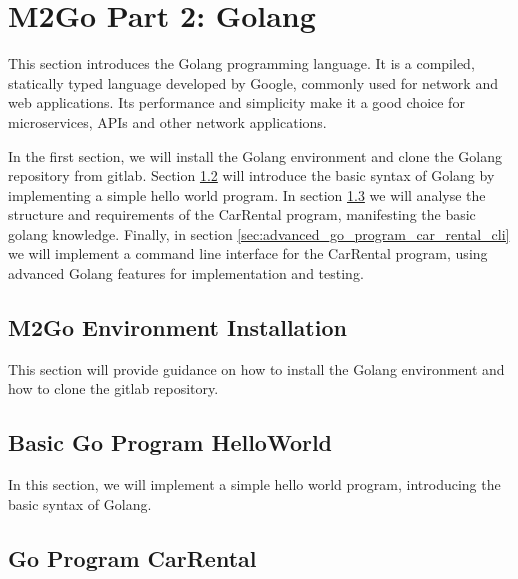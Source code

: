 \chapter{M2Go Part 2: Golang}
\label{cha:golang}
This section introduces the Golang programming language.
It is a compiled, statically typed language developed by Google, commonly used for network and web applications.
Its performance and simplicity make it a good choice for microservices, APIs and other network applications.

In the first section, we will install the Golang environment and clone the Golang repository from gitlab.
Section \ref{sec:basic_go_program} will introduce the basic syntax of Golang by implementing a simple hello world program.
In section \ref{sec:go_program_car_rental} we will analyse the structure and requirements of the CarRental program, manifesting the basic golang knowledge.
Finally, in section \ref{sec:advanced_go_program_car_rental_cli} we will implement a command line interface for the CarRental program, using advanced Golang features for implementation and testing.


\section{M2Go Environment Installation}
\label{sec:m2go_env_installation}
This section will provide guidance on how to install the Golang environment and how to clone the gitlab repository.





\section{Basic Go Program HelloWorld}
\label{sec:basic_go_program}
In this section, we will implement a simple hello world program, introducing the basic syntax of Golang.




\section{Go Program CarRental}
\label{sec:go_program_car_rental}

